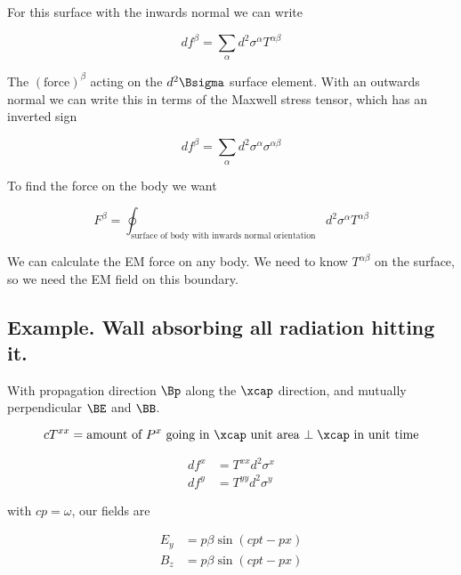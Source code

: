 For this surface with the inwards normal we can write

\begin{equation}\label{eqn:relativisticElectrodynamicsL23:350}
df^\beta = \sum_\alpha d^2\sigma^\alpha T^{\alpha\beta}
\end{equation}

The $(\text{force})^\beta$ acting on the $d^2\Bsigma$ surface element.  With an outwards normal we can write this in terms of the Maxwell stress tensor, which has an inverted sign

\begin{equation}\label{eqn:relativisticElectrodynamicsL23:370}
df^\beta = \sum_\alpha d^2\sigma^\alpha \sigma^{\alpha\beta}
\end{equation}

To find the force on the body we want

\begin{equation}\label{eqn:relativisticElectrodynamicsL23:390}
F^\beta = \oint_{\text{surface of body with inwards normal orientation}} d^2 \sigma^\alpha T^{\alpha\beta}
\end{equation}

We can calculate the EM force on any body.  We need to know $T^{\alpha\beta}$ on the surface, so we need the EM field on this boundary.

\subsection{Example.  Wall absorbing all radiation hitting it.}

With propagation direction $\Bp$ along the $\xcap$ direction, and mutually perpendicular $\BE$ and $\BB$.

\begin{equation}\label{eqn:relativisticElectrodynamicsL23:410}
c T^{xx} = \text{amount of $P^x$ going in $\xcap$ unit area $\perp \xcap$ in unit time}
\end{equation}

\begin{align}\label{eqn:relativisticElectrodynamicsL23:430}
df^x &= T^{x x} d^2 \sigma^x \\
df^y &= T^{y y} d^2 \sigma^y
\end{align}

with $c p = \omega$, our fields are

\begin{align}\label{eqn:relativisticElectrodynamicsL23:450}
E_y &= p \beta \sin( c p t - p x ) \\
B_z &= p \beta \sin( c p t - p x ) 
\end{align}

